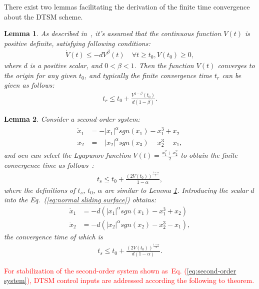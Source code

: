 \documentclass[3p]{elsarticle}
\theoremstyle{plain}
\newtheorem{mylem}{Lemma}
\theoremstyle{remark}
\begin{document}
There exist two lemmas facilitating the derivation of the finite time convergence about the DTSM scheme.
\begin{mylem}
As described in~\cite{moulay2006finite}, it's assumed that the continuous function $V(t)$ is positive definite, satisfying following conditions:
\begin{align}
\dot V(t)\le -dV^\beta(t)\quad\forall t\ge t_0, V(t_0)\ge 0,
\end{align}
where $d$ is a positive scalar, and $0<\beta<1$. Then the function $V(t)$ converges to the origin for any given $t_0$, and typically the finite convergence time $t_r$ can be given as follows:
\begin{align}
t_r \le t_0+\frac{V^{1-\beta}(t_0)}{d(1-\beta)}.
\end{align}\label{lemma:1}
\end{mylem}
\begin{mylem}
Consider a second-order system:
\begin{align}
\begin{split}
\dot x_1&=-\vert x_1\vert^\alpha sgn(x_1)-x_1^3+x_2\\
\dot x_2&=-\vert x_2\vert^\alpha sgn(x_3)-x_2^3-x_1,\label{eq:normal sliding surface}
\end{split}
\end{align}
and oen can select the Lyapunov function $V(t) = \frac{x_1^2+x_2^2}{2}$ to obtain the finite convergence time as follows~\cite{moulay2006finite}:
\begin{align}
t_s\le t_0+\frac{(2V(t_0))^{\frac{1-\alpha}{2}}}{1-\alpha},
\end{align}
where the definitions of  $t_s$, $t_0$, $\alpha$ are similar to Lemma \ref{lemma:1}. Introducing the scalar $d$ into the Eq.~(\ref{eq:normal sliding surface}) obtains:
\begin{align}
\dot x_1&=-d(\vert x_1\vert^\alpha sgn(x_1)-x_1^3+x_2)\\
\dot x_2&=-d(\vert x_2\vert^\alpha sgn(x_2)-x_2^3-x_1),\label{eq:more normal sliding surface}
\end{align}
the convergence time of which is
\begin{align}
t_s\le t_0+\frac{(2V(t_0))^{\frac{1-\alpha}{2}}}{d(1-\alpha)}.
\end{align}\label{lemma:2}
\end{mylem}
\textcolor{red}{For stabilization of the second-order system shown as~Eq. (\ref{eq:second-order system}), DTSM control inputs are addressed according the following to theorem.}
\end{document}

